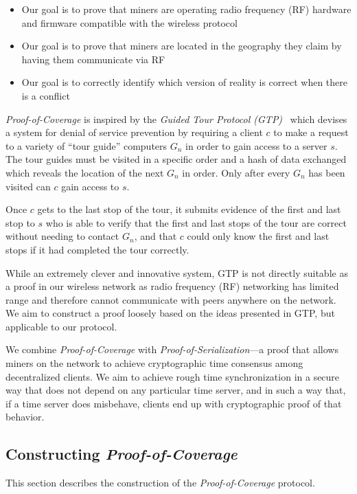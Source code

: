 \documentclass[10pt, nonatbib, nocopyrightspace, reprint]{sigplanconf}
\begin{document}
\begin{itemize}
    \item Our goal is to prove that miners are operating radio frequency (RF) hardware and firmware compatible with the wireless protocol
    \item Our goal is to prove that miners are located in the geography they claim by having them communicate via RF
    \item Our goal is to correctly identify which version of reality is correct when there is a conflict
\end{itemize}

\emph{Proof-of-Coverage} is inspired by the \emph{Guided Tour Protocol (GTP)}~\cite{gtp} which devises a system for denial of service prevention by requiring a client $c$ to make a request to a variety of ``tour guide'' computers $G_n$ in order to gain access to a server $s$. The tour guides must be visited in a specific order and a hash of data exchanged which reveals the location of the next $G_n$ in order. Only after every $G_n$ has been visited can $c$ gain access to $s$.

Once $c$ gets to the last stop of the tour, it submits evidence of the first and last stop to $s$ who is able to verify that the first and last stops of the tour are correct without needing to contact $G_n$, and that $c$ could only know the first and last stops if it had completed the tour correctly.

While an extremely clever and innovative system, GTP is not directly suitable as a proof in our wireless network as radio frequency (RF) networking has limited range and therefore cannot communicate with peers anywhere on the network. We aim to construct a proof loosely based on the ideas presented in GTP, but applicable to our protocol.

We combine \emph{Proof-of-Coverage} with \emph{Proof-of-Serialization}---a proof that allows miners on the network to achieve cryptographic time consensus among decentralized clients. We aim to achieve rough time synchronization in a secure way that does not depend on any particular time server, and in such a way that, if a time server does misbehave, clients end up with cryptographic proof of that behavior.

\subsection{Constructing \emph{Proof-of-Coverage}}

This section describes the construction of the \emph{Proof-of-Coverage} protocol.
\end{document}
